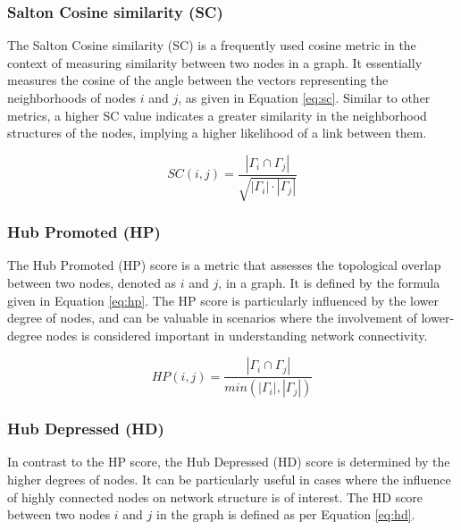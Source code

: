 \subsubsection{Salton Cosine similarity (SC)}

The Salton Cosine similarity (SC) \cite{salton1973specification} is a frequently used cosine metric in the context of measuring similarity between two nodes in a graph. It essentially measures the cosine of the angle between the vectors representing the neighborhoods of nodes $i$ and $j$, as given in Equation \ref{eq:sc}. Similar to other metrics, a higher SC value indicates a greater similarity in the neighborhood structures of the nodes, implying a higher likelihood of a link between them.

\begin{equation}
\label{eq:sc}
  SC(i, j) = \frac{|\Gamma_i \cap \Gamma_j|}{\sqrt{|\Gamma_i| \cdot |\Gamma_j|}}
\end{equation}


\subsubsection{Hub Promoted (HP)}

The Hub Promoted (HP) score \cite{liben2003link} is a metric that assesses the topological overlap between two nodes, denoted as $i$ and $j$, in a graph. It is defined by the formula given in Equation \ref{eq:hp}. The HP score is particularly influenced by the lower degree of nodes, and can be valuable in scenarios where the involvement of lower-degree nodes is considered important in understanding network connectivity.

\begin{equation}
\label{eq:hp}
  HP(i, j) = \frac{|\Gamma_i \cap \Gamma_j|}{min(|\Gamma_i|, |\Gamma_j|)}
\end{equation}


\subsubsection{Hub Depressed (HD)}

In contrast to the HP score, the Hub Depressed (HD) score \cite{zhou2009predicting} is determined by the higher degrees of nodes. It can be particularly useful in cases where the influence of highly connected nodes on network structure is of interest. The HD score between two nodes $i$ and $j$ in the graph is defined as per Equation \ref{eq:hd}.

